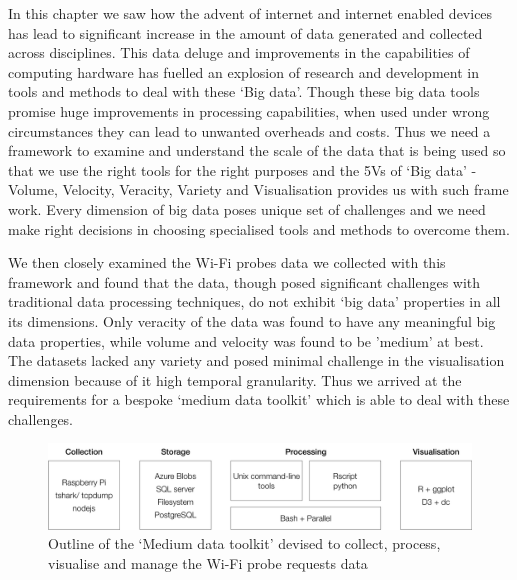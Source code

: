 In this chapter we saw how the advent of internet and internet enabled devices has lead to significant increase in the amount of data generated and collected across disciplines. 
This data deluge and improvements in the capabilities of computing hardware has fuelled an explosion of research and development in tools and methods to deal with these `Big data'.
Though these big data tools promise huge improvements in processing capabilities, when used under wrong circumstances they can lead to unwanted overheads and costs.
Thus we need a framework to examine and understand the scale of the data that is being used so that we use the right tools for the right purposes and the 5Vs of `Big data' - Volume, Velocity, Veracity, Variety and Visualisation provides us with such frame work.
Every dimension of big data poses unique set of challenges and we need make right decisions in choosing specialised tools and methods to overcome them.

We then closely examined the Wi-Fi probes data we collected with this framework and found that the data, though posed significant challenges with traditional data processing techniques, do not exhibit `big data' properties in all its dimensions. 
Only veracity of the data was found to have any meaningful big data properties, while volume and velocity was found to be 'medium' at best. 
The datasets lacked any variety and posed minimal challenge in the visualisation dimension because of it high temporal granularity.
Thus we arrived at the requirements for a bespoke `medium data toolkit' which is able to deal with these challenges.

\begin{figure}
  \includegraphics{images/toolkit.png}
  \caption{Outline of the `Medium data toolkit' devised to collect, process, visualise and manage the Wi-Fi probe requests data}
  \label{figure:toolkit}
\end{figure}

